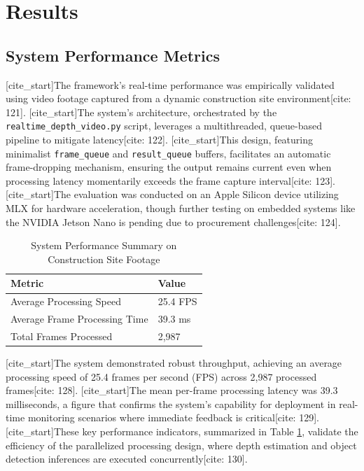 \section{Results}

\subsection{System Performance Metrics}
[cite_start]The framework's real-time performance was empirically validated using video footage captured from a dynamic construction site environment[cite: 121]. [cite_start]The system's architecture, orchestrated by the \texttt{realtime\_depth\_video.py} script, leverages a multithreaded, queue-based pipeline to mitigate latency[cite: 122]. [cite_start]This design, featuring minimalist \texttt{frame\_queue} and \texttt{result\_queue} buffers, facilitates an automatic frame-dropping mechanism, ensuring the output remains current even when processing latency momentarily exceeds the frame capture interval[cite: 123]. [cite_start]The evaluation was conducted on an Apple Silicon device utilizing MLX for hardware acceleration, though further testing on embedded systems like the NVIDIA Jetson Nano is pending due to procurement challenges[cite: 124].

\begin{table}[htbp]
    \centering
    \caption{System Performance Summary on Construction Site Footage}
    \label{tab:performance}
    \begin{tabular}{|l|l|}
        \hline
        \textbf{Metric} & \textbf{Value} \\
        \hline
        Average Processing Speed & 25.4 FPS \\
        \hline
        Average Frame Processing Time & 39.3 ms \\
        \hline
        Total Frames Processed & 2,987 \\
        \hline
    \end{tabular}
\end{table}

[cite_start]The system demonstrated robust throughput, achieving an average processing speed of 25.4 frames per second (FPS) across 2,987 processed frames[cite: 128]. [cite_start]The mean per-frame processing latency was 39.3 milliseconds, a figure that confirms the system's capability for deployment in real-time monitoring scenarios where immediate feedback is critical[cite: 129]. [cite_start]These key performance indicators, summarized in Table \ref{tab:performance}, validate the efficiency of the parallelized processing design, where depth estimation and object detection inferences are executed concurrently[cite: 130].

